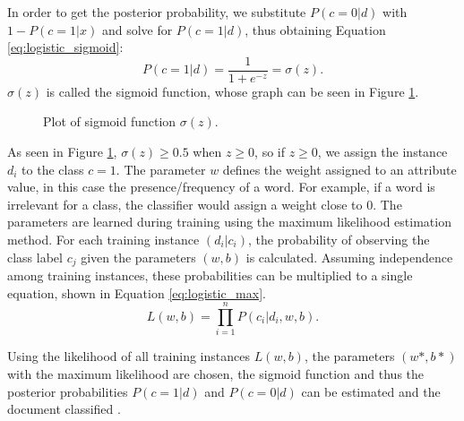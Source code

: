 In order to get the posterior probability, we substitute $P(c=0|d)$ with $1 - P(c=1|x)$ and solve for $P(c=1|d)$, thus obtaining Equation \eqref{eq:logistic_sigmoid}:
        {\begin{equation}
            \label{eq:logistic_sigmoid}
                P(c=1|d) = \frac{1}{1+e^{-z}} = \sigma(z).
        \end{equation}}
$\sigma(z)$ is called the sigmoid function, whose graph can be seen in Figure \ref{fig:sigmoid}.
        \begin{figure}
        \centering

    \caption{Plot of sigmoid function $\sigma(z)$.}
      \label{fig:sigmoid}
\end{figure}
As seen in Figure \ref{fig:sigmoid}, $\sigma(z) \geq 0.5$ when $z \geq 0$, so if $z \geq 0$, we assign the instance $d_i$ to the class $c = 1$. The parameter $w$ defines the weight assigned to an attribute value, in this case the presence/frequency of a word. For example, if a word is irrelevant for a class, the classifier would assign a weight close to 0. The parameters are learned during training using the maximum likelihood estimation method. For each training instance $(d_i|c_i)$, the probability of observing the class label $c_j$ given the parameters $(w,b)$ is calculated. Assuming independence among training instances, these probabilities can be multiplied to a single equation, shown in Equation \eqref{eq:logistic_max}.
        \begin{equation}
            \label{eq:logistic_max}
                L(w,b) = \prod_{i=1}^{n}P(c_i|d_i,w,b).
        \end{equation}
        
Using the likelihood of all training instances $L(w,b)$, the parameters $(w*,b*)$ with the maximum likelihood are chosen, the sigmoid function and thus the posterior probabilities $P(c=1|d)$ and $P(c=0|d)$ can be estimated and the document classified \cite{DBLP:books/aw/TanSKK2019}.


